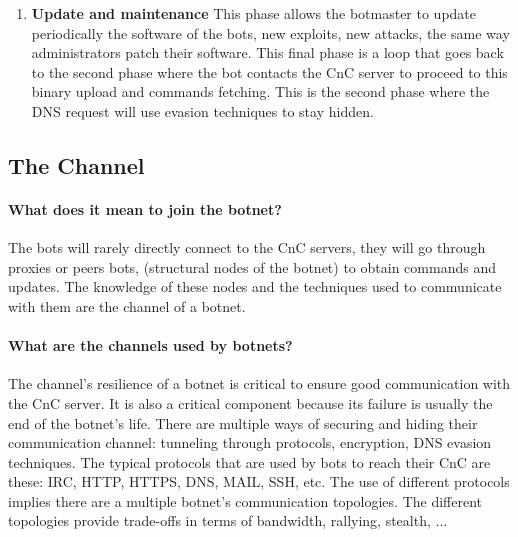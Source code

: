 \begin{enumerate}
\item \textbf{Update and maintenance}
This phase allows the botmaster to update periodically the software of the bots, new exploits, new attacks, the same way administrators patch their software. This final phase is a loop that goes back to the second phase where the bot contacts the CnC server to proceed to this binary upload and commands fetching. This is the second phase where the DNS request will use evasion techniques to stay hidden.
\end{enumerate}

\subsection{The Channel}
\paragraph{What does it mean to join the botnet?} The bots will rarely directly connect to the CnC servers, they will go through proxies or peers bots, (structural nodes of the botnet) to obtain commands and updates. The knowledge of these nodes and the techniques used to communicate with them are the channel of a botnet.
\paragraph{What are the channels used by botnets?} The channel's resilience of a botnet is critical to ensure good communication with the CnC server. It is also a critical component because its failure is usually the end of the botnet's life. There are multiple ways of securing and hiding their communication channel: tunneling through protocols, encryption, DNS evasion techniques.
The typical protocols that are used by bots to reach their CnC are these: IRC, HTTP, HTTPS, DNS, MAIL, SSH, etc. The use of different protocols implies there are a multiple botnet's communication topologies. The different topologies provide trade-offs in terms of bandwidth, rallying, stealth, ...


